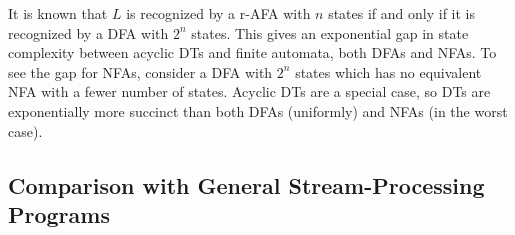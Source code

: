 It is known \cite{chandra1981alternation,fellah1990constructions} that $L$ is recognized by a r-AFA with $n$ states if and only if it is recognized by a DFA with $2^n$ states. This gives an exponential gap in state complexity between acyclic DTs and finite automata, both DFAs and NFAs. To see the gap for NFAs, consider a DFA with $2^n$ states which has no equivalent NFA with a fewer number of states. Acyclic DTs are a special case, so DTs are exponentially more succinct than both DFAs (uniformly) and NFAs (in the worst case).

\subsection{Comparison with General Stream-Processing Programs}
\label{dt:subsec:dts-and-spp}


